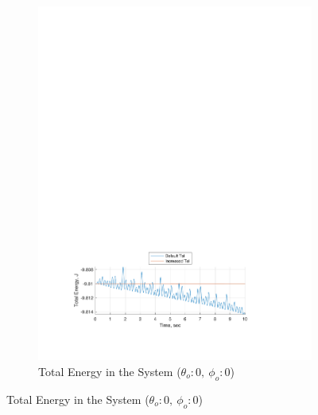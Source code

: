 \documentclass[12pt]{report}
\begin{document}
\begin{flushleft}
\begin{figure}[!htp]
  \caption{Total Energy Comparison Plots}
\begin{subfigure}[t]{\textwidth}
  \includegraphics[center]{Energy1}
  \caption{Total Energy in the System ($\theta_o:0,~\phi_o:0$)}
  \label{fig:Energy1}
\end{subfigure}
\end{figure}
\null
\begin{figure}[!ht] \ContinuedFloat
\begin{subfigure}[t]{\textwidth}

\end{subfigure}
\end{figure}
\end{flushleft}
\end{document}
